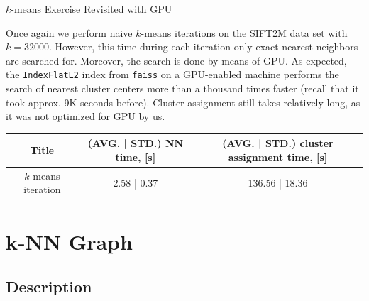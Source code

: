 \begin{frame}

\begin{block}{$k$-means Exercise Revisited with GPU}

Once again we perform naive $k$-means iterations on the SIFT2M data set with $k = 32000$. However, this time during each iteration only exact nearest neighbors are searched for. Moreover, the search is done by means of GPU. As expected, the \texttt{IndexFlatL2} index from \texttt{faiss} on a GPU-enabled machine performs the search of nearest cluster centers more than a thousand times faster (recall that it took approx. 9K seconds before). Cluster assignment still takes relatively long, as it was not optimized for GPU by us.
	
\end{block}


	\begin{table}
		\small
		\begin{tabular}{| c || c | c |}
			\hline
			Title & (AVG. | STD.) NN time, [s] & (AVG. | STD.) cluster assignment time, [s] \\
			\hline
			\hline			
			$k$-means iteration & 2.58 | 0.37 & 136.56 | 18.36 \\
			\hline  
		\end{tabular}
	\end{table}
\end{frame}


\section{k-NN Graph}
\subsection{Description}


